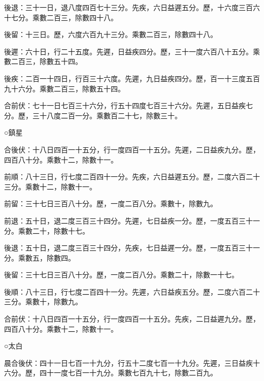 \begin{pinyinscope}
 後退：三十一日，退八度四百七十三分。先疾，六日益遲五分。歷，十六度三百六十七分。乘數二百三，除數四十八。



 後留：十三日。歷，六度六百九十三分。乘數二百三，除數四十八。



 後遲：六十日，行二十五度。先遲，日益疾四分。歷，三十一度六百八十五分。乘數二百三，除數五十四。



 後疾：二百一十四日，行百三十六度。先遲，九日益疾四分。歷，百一十三度五百九十六分。乘數二百三，除數五十四。



 合前伏：七十一日七百三十六分，行五十四度七百三十六分。先遲，五日益疾七分。歷，三十八度二百一分。乘數百二十七，除數三十。



 ○鎮星



 合後伏：十八日四百一十五分，行一度四百一十五分。先遲，二日益疾九分。歷，四百八十分。乘數十二，除數十一。



 前順：八十三日，行七度二百四十一分。先疾，六日益遲五分。歷，二度六百二十三分。乘數十二，除數十一。



 前留：三十七日三百八十分。歷，一度二百八分。乘數十，除數九。



 前退：五十日，退二度三百三十四分。先遲，七日益疾一分。歷，一度五百三十一分。乘數二十，除數十七。



 後退：五十日，退二度三百三十四分，先疾，七日益遲一分。歷，一度五百三十一分。乘數五，除數四。



 後留：三十七日三百八十分。歷，一度二百八分。乘數二十，除數一十七。



 後順：八十三日，行七度二百四十一分。先遲，六日益疾五分。歷，二度六百二十三分。乘數十，除數九。



 合前伏：十八日四百一十五分，行一度四百一十五分。先疾，二日益遲九分。歷，四百八十分。乘數十二，除數十一。



 ○太白



 晨合後伏：四十一日七百一十九分，行五十二度七百一十九分。先遲，三日益疾十六分。歷，四十一度七百一十九分。乘數七百九十七，除數二百九。




\end{pinyinscope}
